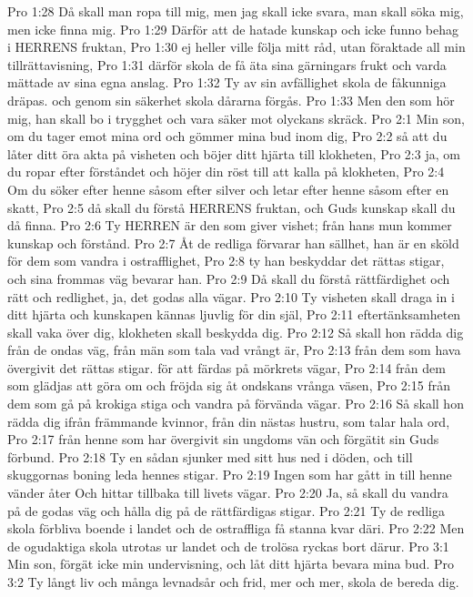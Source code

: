 Pro 1:28  Då skall man ropa till mig, men jag skall icke svara, man skall söka mig, men icke finna mig.
Pro 1:29  Därför att de hatade kunskap och icke funno behag i HERRENS fruktan,
Pro 1:30  ej heller ville följa mitt råd, utan föraktade all min tillrättavisning,
Pro 1:31  därför skola de få äta sina gärningars frukt och varda mättade av sina egna anslag.
Pro 1:32  Ty av sin avfällighet skola de fåkunniga dräpas. och genom sin säkerhet skola dårarna förgås.
Pro 1:33  Men den som hör mig, han skall bo i trygghet och vara säker mot olyckans skräck.
Pro 2:1  Min son, om du tager emot mina ord och gömmer mina bud inom dig,
Pro 2:2  så att du låter ditt öra akta på visheten och böjer ditt hjärta till klokheten,
Pro 2:3  ja, om du ropar efter förståndet och höjer din röst till att kalla på klokheten,
Pro 2:4  Om du söker efter henne såsom efter silver och letar efter henne såsom efter en skatt,
Pro 2:5  då skall du förstå HERRENS fruktan, och Guds kunskap skall du då finna.
Pro 2:6  Ty HERREN är den som giver vishet; från hans mun kommer kunskap och förstånd.
Pro 2:7  Åt de redliga förvarar han sällhet, han är en sköld för dem som vandra i ostrafflighet,
Pro 2:8  ty han beskyddar det rättas stigar, och sina frommas väg bevarar han.
Pro 2:9  Då skall du förstå rättfärdighet och rätt och redlighet, ja, det godas alla vägar.
Pro 2:10  Ty visheten skall draga in i ditt hjärta och kunskapen kännas ljuvlig för din själ,
Pro 2:11  eftertänksamheten skall vaka över dig, klokheten skall beskydda dig.
Pro 2:12  Så skall hon rädda dig från de ondas väg, från män som tala vad vrångt är,
Pro 2:13  från dem som hava övergivit det rättas stigar. för att färdas på mörkrets vägar,
Pro 2:14  från dem som glädjas att göra om och fröjda sig åt ondskans vrånga väsen,
Pro 2:15  från dem som gå på krokiga stiga och vandra på förvända vägar.
Pro 2:16  Så skall hon rädda dig ifrån främmande kvinnor, från din nästas hustru, som talar hala ord,
Pro 2:17  från henne som har övergivit sin ungdoms vän och förgätit sin Guds förbund.
Pro 2:18  Ty en sådan sjunker med sitt hus ned i döden, och till skuggornas boning leda hennes stigar.
Pro 2:19  Ingen som har gått in till henne vänder åter Och hittar tillbaka till livets vägar.
Pro 2:20  Ja, så skall du vandra på de godas väg och hålla dig på de rättfärdigas stigar.
Pro 2:21  Ty de redliga skola förbliva boende i landet och de ostraffliga få stanna kvar däri.
Pro 2:22  Men de ogudaktiga skola utrotas ur landet och de trolösa ryckas bort därur.
Pro 3:1  Min son, förgät icke min undervisning, och låt ditt hjärta bevara mina bud.
Pro 3:2  Ty långt liv och många levnadsår och frid, mer och mer, skola de bereda dig.
